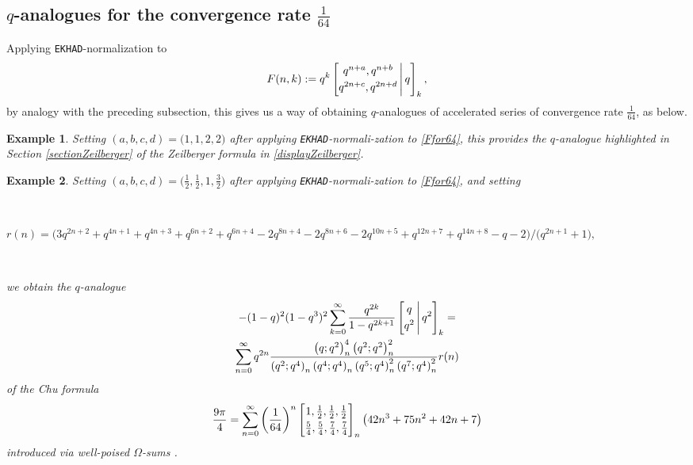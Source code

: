 \documentclass[12pt]{article}
\newtheorem{example}{Example}
\begin{document}
\subsection{$q$-analogues for the convergence rate $\frac{1}{64}$}
 Applying {\tt EKHAD}-normalization to 
\begin{equation}\label{Ffor64}
 F(n, k) := q^{k} \left[ \begin{matrix} 
 q^{n+a}, q^{n+b} \vspace{1mm} \\ 
 q^{2n+c}, q^{2n+d} \end{matrix} \, \Bigg| \, q \right]_{k}, 
\end{equation}
 by analogy with the preceding subsection, 
 this gives us 
 a way of obtaining $q$-analogues of 
 accelerated series of convergence rate $\frac{1}{64}$, as below. 

\begin{example}
 Setting $(a,b,c,d) = \big( 1, 1, 2, 2 \big)$ after applying {\tt EKHAD}-normali-zation to \eqref{Ffor64}, 
 this provides the $q$-analogue 
 highlighted in Section \ref{sectionZeilberger}
 of the Zeilberger formula in \eqref{displayZeilberger}. 
\end{example}

\begin{example}
 Setting $(a,b,c,d) = \big( \frac{1}{2}, \frac{1}{2}, 1, \frac{3}{2} \big)$
 after applying {\tt EKHAD}-normali-zation to 
 \eqref{Ffor64}, 
 and setting 

 \ 

\noindent $ r(n) = \big( 3 q^{2 n+2}+q^{4 n+1}+q^{4 n+3}+q^{6 n+2}+q^{6 n+4}-2 q^{8 n+4}-2 q^{8 n+6}-2 q^{10 n+5}+q^{12 n+7}+q^{14 n+8}-q-2
 \big)/\big( q^{2 n+1}+1 \big), $ 

 \ 

\noindent we obtain the $q$-analogue 
\begin{multline*}
 -(1-q)^2 (1-q^3)^{2} \sum_{k=0}^{\infty} \frac{q^{2k}}{1-q^{2k+1}} 
 \left[ \begin{matrix} 
 q \vspace{1mm} \\ 
 q^2 \end{matrix} \, \Bigg| \, q^2 \right]_{k} = \\ 
 \sum_{n=0}^{\infty} q^{2n} \frac{ \left( q;q^{2} \right)_{n}^{4} 
 \left( q^{2};q^{2} \right)_{n}^{2} }{ \left( q^{2};q^{4} \right)_{n} 
 \left( q^{4};q^{4} \right)_{n} 
 \left( q^{5};q^{4} \right)_{n}^{2} \left( q^{7};q^{4} \right)_{n}^{2} } r(n)
\end{multline*} 
 of the Chu formula 
\begin{equation*}
 \frac{9\pi}{4} = 
 \sum_{n = 0}^{\infty} 
 \left( \frac{1}{64} \right)^{n} \left[ \begin{matrix} 
 1, \frac{1}{2}, \frac{1}{2}, \frac{1}{2} 
 \vspace{1mm} \\ 
 \frac{5}{4}, \frac{5}{4}, \frac{7}{4}, \frac{7}{4}
 \end{matrix} \right]_{n} \left( 42n^3 + 75n^2+42n + 7 \right) 
 \end{equation*} 
 introduced via well-poised $\Omega$-sums \cite{Chu2021Omega}. 
\end{example}
\end{document}
